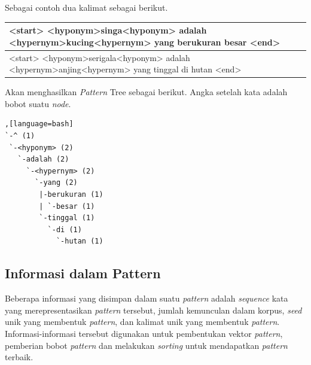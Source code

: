 \noindent Sebagai contoh dua kalimat sebagai berikut.
\begin{center}
  \begin{tabular}{ | m{32em} | } 
  \hline
  <start> <hyponym>singa<hyponym> adalah <hypernym>kucing<hypernym> yang berukuran besar <end> \\ \hline
  \hline
  <start> <hyponym>serigala<hyponym> adalah <hypernym>anjing<hypernym> yang tinggal di hutan <end>\\ \hline
  \end{tabular}
\end{center}

\noindent Akan menghasilkan \textit{Pattern} Tree sebagai berikut. Angka setelah kata adalah bobot suatu \textit{node}.
\begin{lstlisting},[language=bash]
`-^ (1)
 `-<hyponym> (2)
   `-adalah (2)
     `-<hypernym> (2)
       `-yang (2)
        |-berukuran (1)
        | `-besar (1)
        `-tinggal (1)
          `-di (1)
            `-hutan (1)
\end{lstlisting}

\subsection{Informasi dalam Pattern}
Beberapa informasi yang disimpan dalam suatu \textit{pattern} adalah \textit{sequence} kata yang merepresentasikan \textit{pattern} tersebut, jumlah kemunculan dalam korpus, \textit{seed} unik yang membentuk \textit{pattern}, dan kalimat unik yang membentuk \textit{pattern}. Informasi-informasi tersebut digunakan untuk pembentukan vektor \textit{pattern}, pemberian bobot \textit{pattern} dan melakukan \textit{sorting} untuk mendapatkan \textit{pattern} terbaik.

